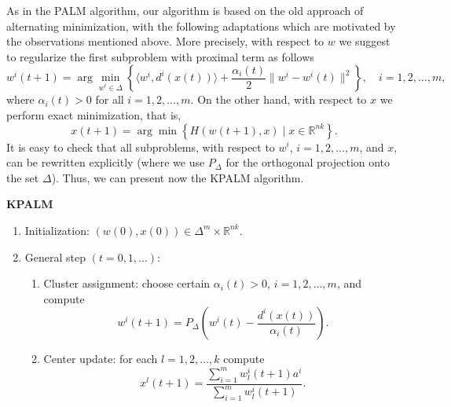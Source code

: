 As in the PALM algorithm, our algorithm is based on the old approach of alternating minimization, with the following adaptations which are motivated by the observations mentioned above. More precisely, with respect to $w$ we suggest to regularize the first subproblem with proximal term as follows
\begin{equation}
	w^i(t+1) = \arg\!\min\limits_{w^i \in \Delta} \left\lbrace \langle w^i , d^i(x(t)) \rangle + \frac{\alpha_i(t)}{2} \|w^i - w^i(t)\|^2 \right\rbrace, \quad i=1,2, \ldots, m , \label{State_w_update}
\end{equation}
where $\alpha_i(t) > 0$ for all $i=1,2, \ldots, m$. On the other hand, with respect to $x$ we perform exact minimization, that is,
\begin{equation}
	x(t+1) = \arg\!\min \left\lbrace H(w(t+1), x) \mid x \in \mathbb{R}^{nk} \right\rbrace . \label{State_x_update}
\end{equation}
It is easy to check that all subproblems, with respect to $w^i$, $i=1,2, \ldots, m$, and $x$, can be rewritten explicitly (where we use $P_{\Delta}$ for the orthogonal projection onto the set $\Delta$). Thus, we can present now the KPALM algorithm.
\begin{framed}
\noindent \textbf{KPALM}
\begin{enumerate}[(1)]
	\item Initialization: $(w(0),x(0)) \in \Delta^m \times \mathbb{R}^{nk} .$
	\item General step $\left( t=0,1, \ldots \right)$:
	\begin{enumerate}[(2.1)]
		\item Cluster assignment: choose certain $\alpha_i(t) > 0$, $i=1,2, \ldots, m$, and compute
		\begin{equation}
			w^i(t+1) = P_{\Delta} \left(w^i(t) - \frac{d^i(x(t))}{\alpha_i(t)}\right) . \label{StateEq5}
		\end{equation}
		\item Center update: for each $l=1, 2, \ldots ,k$ compute
		\begin{equation}
			x^l(t+1) = \frac{\sum_{i=1}^{m} w^i_l(t+1) a^i}{\sum_{i=1}^{m} w^i_l(t+1)} . \label{StateEq6}
		\end{equation}
	\end{enumerate}
\end{enumerate}
\end{framed}


